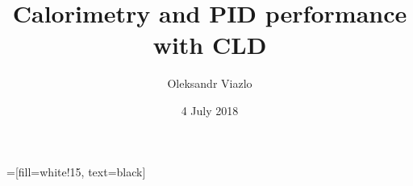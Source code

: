 \documentclass[8pt]{beamer}
\newif\ifplacelogo %
\begin{document}
\newcommand{\myNode}{\tikz[baseline,inner sep=1pt] \node[anchor=base]}

 =[fill=white!15, text=black]



\title[Calorimetry performance with CLD \hspace{14.0em}\insertframenumber/
\inserttotalframenumber]{ Calorimetry and PID performance with CLD }


	\author[Oleksandr Viazlo]{Oleksandr Viazlo\\ 
	{\small }
	}
	
       
	\date{4 July 2018}


	
   	\frame{\titlepage}

   	

\placelogofalse
\end{document}
